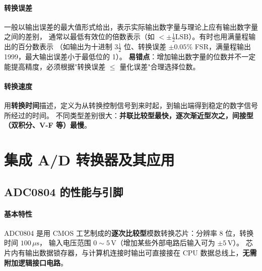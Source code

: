 \paragraph{转换误差}
一般以输出误差的最大值形式给出，表示实际输出数字量与理论上应有输出数字量之间的差别，
通常以最低有效位的倍数表示（如 $<\pm\frac{1}{2}\text{LSB}$）。有时也用满量程输出的百分数表示
（如输出为十进制 $3\frac{1}{2}$ 位、转换误差 $\pm0.05\%$ FSR，满量程输出 1999，最大输出误差小于最低位的 1）。
\textbf{易错点}：增加输出数字量的位数并不一定能提高精度，必须根据"转换误差 $\le$ 量化误差"合理选择位数。

\paragraph{转换速度}
用\textbf{转换时间}描述，定义为从转换控制信号到来时起，到输出端得到稳定的数字信号所经过的时间。
不同类型差别很大：\textbf{并联比较型最快，逐次渐近型次之，间接型（双积分、V-F 等）最慢}。

\section{集成 A/D 转换器及其应用}
\subsection{ADC0804 的性能与引脚}
\paragraph{基本特性}
ADC0804 是用 CMOS 工艺制成的\textbf{逐次比较型}模数转换芯片：分辨率 8 位，转换时间 $100\,\mu\mathrm{s}$，
输入电压范围 $0\sim5\,\mathrm{V}$（增加某些外部电路后输入可为 $\pm5\,\mathrm{V}$）。
芯片内有输出数据锁存器，与计算机连接时输出可直接接在 CPU 数据总线上，\textbf{无需附加逻辑接口电路}。

